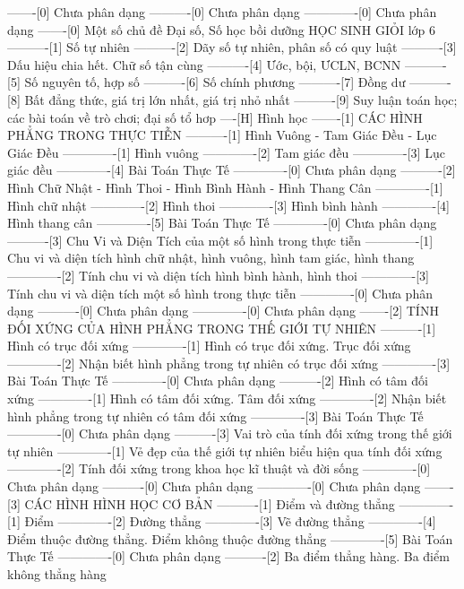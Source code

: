 -------[0] Chưa phân dạng
----------[0] Chưa phân dạng
-------------[0] Chưa phân dạng
-------[0] Một số chủ đề Đại số, Số học bồi dưỡng HỌC SINH GIỎI lớp 6
----------[1] Số tự nhiên
----------[2] Dãy số tự nhiên, phân số có quy luật
----------[3] Dấu hiệu chia hết. Chữ số tận cùng
----------[4] Ước, bội, ƯCLN, BCNN
----------[5] Số nguyên tố, hợp số
----------[6] Số chính phương
----------[7] Đồng dư
----------[8] Bất đẳng thức, giá trị lớn nhất, giá trị nhỏ nhất
----------[9] Suy luận toán học; các bài toán về trò chơi; đại số tổ hơp
----[H] Hình học
-------[1] CÁC HÌNH PHẲNG TRONG THỰC TIỄN
----------[1] Hình Vuông - Tam Giác Đều - Lục Giác Đều
-------------[1] Hình vuông
-------------[2] Tam giác đều
-------------[3] Lục giác đều
-------------[4] Bài Toán Thực Tế
-------------[0] Chưa phân dạng
----------[2] Hình Chữ Nhật - Hình Thoi - Hình Bình Hành - Hình Thang Cân
-------------[1] Hình chữ nhật
-------------[2] Hình thoi
-------------[3] Hình bình hành
-------------[4] Hình thang cân
-------------[5] Bài Toán Thực Tế
-------------[0] Chưa phân dạng
----------[3] Chu Vi và Diện Tích của một số hình trong thực tiễn
-------------[1] Chu vi và diện tích hình chữ nhật, hình vuông, hình tam giác, hình thang
-------------[2] Tính chu vi và diện tích hình bình hành, hình thoi
-------------[3] Tính chu vi và diện tích một số hình trong thực tiễn
-------------[0] Chưa phân dạng
----------[0] Chưa phân dạng
-------------[0] Chưa phân dạng
-------[2] TÍNH ĐỐI XỨNG CỦA HÌNH PHẲNG TRONG THẾ GIỚI TỰ NHIÊN
----------[1] Hình có trục đối xứng
-------------[1] Hình có trục đối xứng. Trục đối xứng
-------------[2] Nhận biết hình phẳng trong tự nhiên có trục đối xứng
-------------[3] Bài Toán Thực Tế
-------------[0] Chưa phân dạng
----------[2] Hình có tâm đối xứng
-------------[1] Hình có tâm đối xứng. Tâm đối xứng
-------------[2] Nhận biết hình phẳng trong tự nhiên có tâm đối xứng
-------------[3] Bài Toán Thực Tế
-------------[0] Chưa phân dạng
----------[3] Vai trò của tính đối xứng trong thế giới tự nhiên
-------------[1] Vẻ đẹp của thế giới tự nhiên biểu hiện qua tính đối xứng
-------------[2] Tính đối xứng trong khoa học kĩ thuật và đời sống
-------------[0] Chưa phân dạng
----------[0] Chưa phân dạng
-------------[0] Chưa phân dạng
-------[3] CÁC HÌNH HÌNH HỌC CƠ BẢN
----------[1] Điểm và đường thẳng
-------------[1] Điểm
-------------[2] Đường thẳng
-------------[3] Vẽ đường thẳng
-------------[4] Điểm thuộc đường thẳng. Điểm không thuộc đường thẳng
-------------[5] Bài Toán Thực Tế
-------------[0] Chưa phân dạng
----------[2] Ba điểm thẳng hàng. Ba điểm không thẳng hàng
